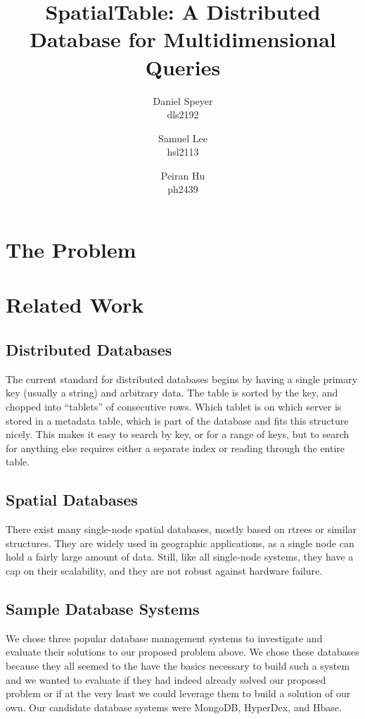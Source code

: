 \documentclass[11pt]{article}
\begin{document}
\author{Daniel Speyer\\dls2192 \and Samuel Lee\\hsl2113 \and Peiran Hu\\ph2439}
\title{SpatialTable: A Distributed Database for Multidimensional Queries}

\maketitle

\section{The Problem}

\section{Related Work}

\subsection{Distributed Databases}

The current standard for distributed databases begins by having a single primary key (usually a string) and arbitrary data. The table is sorted by the key, and chopped into ``tablets'' of consecutive rows. Which tablet is on which server is stored in a metadata table, which is part of the database and fits this structure nicely. This makes it easy to search by key, or for a range of keys, but to search for anything else requires either a separate index or reading through the entire table.

\subsection{Spatial Databases}

There exist many single-node spatial databases, mostly based on rtrees or similar structures. They are widely used in geographic applications, as a single node can hold a fairly large amount of data. Still, like all single-node systems, they have a cap on their scalability, and they are not robust against hardware failure.

\subsection{Sample Database Systems}

We chose three popular database management systems to investigate and evaluate their solutions to our proposed problem above. We chose these databases because they all seemed to the have the basics necessary to build such a system and we wanted to evaluate if they had indeed already solved our proposed problem or if at the very least we could leverage them to build a solution of our own. Our candidate database systems were MongoDB, HyperDex, and Hbase.
\end{document}
